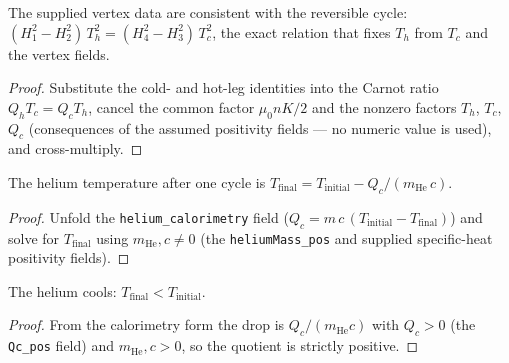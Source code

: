 \begin{lemma}
\label{lem:IPhO2026Problems_problem_IPhO_2026_3_C_3:reservoir_temperature_consistency}
The supplied vertex data are consistent with the reversible cycle:
$(H_1^2 - H_2^2)\,T_h^2 = (H_4^2 - H_3^2)\,T_c^2$, the exact relation that
fixes $T_h$ from $T_c$ and the vertex fields.
\end{lemma}
\begin{proof}
Substitute the cold- and hot-leg identities into the Carnot ratio
$Q_h T_c = Q_c T_h$, cancel the common factor $\mu_0 n K / 2$ and the nonzero
factors $T_h$, $T_c$, $Q_c$ (consequences of the assumed positivity fields —
no numeric value is used), and cross-multiply.
\end{proof}

\begin{lemma}
\label{lem:IPhO2026Problems_problem_IPhO_2026_3_C_3:TFinal_from_calorimetry}
The helium temperature after one cycle is
$T_{\mathrm{final}} = T_{\mathrm{initial}} - Q_c / (m_{\mathrm{He}}\,c)$.
\end{lemma}
\begin{proof}
Unfold the \texttt{helium\_calorimetry} field
($Q_c = m\,c\,(T_{\mathrm{initial}} - T_{\mathrm{final}})$) and solve for
$T_{\mathrm{final}}$ using $m_{\mathrm{He}}, c \neq 0$ (the
\texttt{heliumMass\_pos} and supplied specific-heat positivity fields).
\end{proof}

\begin{lemma}
\label{lem:IPhO2026Problems_problem_IPhO_2026_3_C_3:helium_cools}
The helium cools: $T_{\mathrm{final}} < T_{\mathrm{initial}}$.
\end{lemma}
\begin{proof}
From the calorimetry form the drop is $Q_c / (m_{\mathrm{He}} c)$ with
$Q_c > 0$ (the \texttt{Qc\_pos} field) and $m_{\mathrm{He}}, c > 0$, so the
quotient is strictly positive.
\end{proof}

